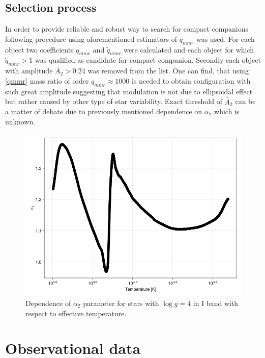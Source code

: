 \documentclass{pracalicmgr}
\begin{document}
\section{Selection process}
In order to provide reliable and robust way to search for compact companions following procedure using aforementioned estimators of $q_{mmr}$ was used.
For each object two coefficients $q_{mmr}$ and $\tilde{q}_{mmr}$ were calculated and each object for which $\tilde{q}_{mmr}>1$ was qualified as candidate for compact companion.
Secondly each object with amplitude $\tilde{A_2}>0.24$ was removed from the list. One can find, that using \ref{qmmr} mass ratio of order $q_{mmr}\approx 1000$ is needed
to obtain configuration with such great amplitude 
suggesting that modulation is not due to ellipsoidal effect but rather caused by other type of star variability. Exact threshold of $\tilde{A_2}$ can be a matter of debate due to 
previously mentioned dependence on $\alpha_2$ which is unknown. 
\begin{figure}[H]
    \centering
    \includegraphics[scale=0.4]{plots/A_2_dependence.png}
    \caption{Dependence of $\alpha_2$ parameter for stars with $\log g=4$ in I band with respect to effective temperature.}
    \label{claret}
\end{figure}

\chapter{Observational data}
\end{document}
